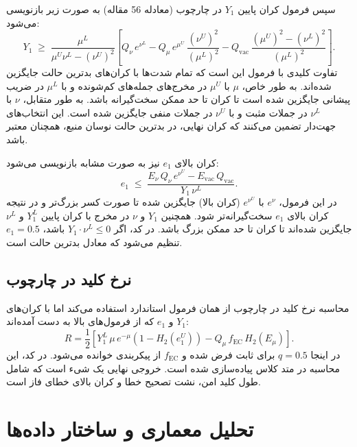 سپس فرمول کران پایین $Y_1$ در چارچوب  (معادله 56 مقاله) به صورت زیر بازنویسی می‌شود:
\begin{equation}
	Y_1 \;\ge\; \frac{\mu^L}{\mu^U \nu^L - (\nu^U)^2}\left[Q_\nu\,e^{\nu^L} - Q_\mu\,e^{\mu^U}\,\frac{(\nu^U)^2}{(\mu^L)^2} - Q_{\text{vac}}\,\frac{(\mu^U)^2 - (\nu^L)^2}{(\mu^L)^2}\right].
\end{equation}
تفاوت کلیدی با فرمول  این است که تمام شدت‌ها با کران‌های بدترین حالت جایگزین شده‌اند. به طور خاص، $\mu$ با $\mu^U$ در مخرج‌های جمله‌های کم‌شونده و با $\mu^L$ در ضریب پیشانی جایگزین شده است تا کران تا حد ممکن سخت‌گیرانه باشد. به طور متقابل، $\nu$ با $\nu^L$ در جملات مثبت و با $\nu^U$ در جملات منفی جایگزین شده است. این انتخاب‌های جهت‌دار تضمین می‌کنند که کران نهایی، در بدترین حالت نوسان منبع، همچنان معتبر باشد.

کران بالای $e_1$ نیز به صورت مشابه بازنویسی می‌شود:
\begin{equation}
	e_1 \;\le\; \frac{E_\nu\,Q_\nu\,e^{\nu^U} - E_{\text{vac}}\,Q_{\text{vac}}}{Y_1\,\nu^L}.
\end{equation}
در این فرمول، $e^{\nu}$ با $e^{\nu^U}$ (کران بالا) جایگزین شده تا صورت کسر بزرگ‌تر و در نتیجه کران بالای $e_1$ سخت‌گیرانه‌تر شود. همچنین $Y_1$ و $\nu$ در مخرج با کران پایین $Y_1^L$ و $\nu^L$ جایگزین شده‌اند تا کران تا حد ممکن بزرگ باشد. در کد، اگر $Y_1 \cdot \nu^L \le 0$ باشد، $e_1 = 0.5$ تنظیم می‌شود که معادل بدترین حالت است.

\subsection{نرخ کلید در چارچوب }

محاسبه نرخ کلید در چارچوب  از همان فرمول استاندارد  استفاده می‌کند اما با کران‌های $Y_1$ و $e_1$ که از فرمول‌های بالا به دست آمده‌اند:
\begin{equation}
	R = \frac{1}{2}\left[Y_1^L\,\mu\,e^{-\mu}\left(1 - H_2(e_1^U)\right) - Q_\mu\,f_{\text{EC}}\,H_2(E_\mu)\right].
\end{equation}
در اینجا $q = 0.5$ برای  ثابت فرض شده و $f_{\text{EC}}$ از پیکربندی خوانده می‌شود. در کد، این محاسبه در متد  کلاس  پیاده‌سازی شده است. خروجی نهایی یک شیء  است که شامل طول کلید امن، نشت تصحیح خطا و کران بالای خطای فاز است.

\section{تحلیل معماری و ساختار داده‌ها}

